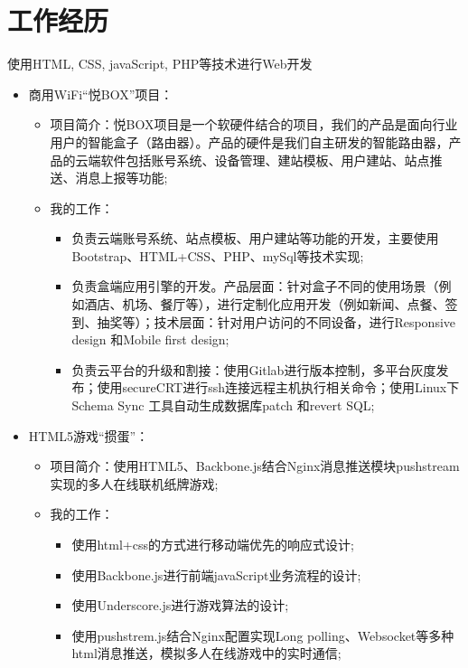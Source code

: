 \documentclass[11pt,a4paper,sans]{moderncv}        %
\begin{document}
\section{工作经历}
{使用HTML, CSS, javaScript, PHP等技术进行Web开发
\newline{}%
\begin{itemize}%
\item 商用WiFi“悦BOX”项目：
  \begin{itemize}%
  \item 项目简介：悦BOX项目是一个软硬件结合的项目，我们的产品是面向行业用户的智能盒子（路由器）。产品的硬件是我们自主研发的智能路由器，产品的云端软件包括账号系统、设备管理、建站模板、用户建站、站点推送、消息上报等功能;
  \item 我的工作：
      \begin{itemize}%
        \item 负责云端账号系统、站点模板、用户建站等功能的开发，主要使用Bootstrap、HTML+CSS、PHP、mySql等技术实现;
        \item 负责盒端应用引擎的开发。产品层面：针对盒子不同的使用场景（例如酒店、机场、餐厅等），进行定制化应用开发（例如新闻、点餐、签到、抽奖等）；技术层面：针对用户访问的不同设备，进行Responsive design 和Mobile first design;
        \item 负责云平台的升级和割接：使用Gitlab进行版本控制，多平台灰度发布；使用secureCRT进行ssh连接远程主机执行相关命令；使用Linux下Schema Sync 工具自动生成数据库patch 和revert SQL;
      \end{itemize}
  \end{itemize}
\item HTML5游戏“掼蛋”：
  \begin{itemize}%
  \item 项目简介：使用HTML5、Backbone.js结合Nginx消息推送模块pushstream实现的多人在线联机纸牌游戏;
  \item 我的工作：
      \begin{itemize}%
        \item 使用html+css的方式进行移动端优先的响应式设计;
        \item 使用Backbone.js进行前端javaScript业务流程的设计;
        \item 使用Underscore.js进行游戏算法的设计;
        \item 使用pushstrem.js结合Nginx配置实现Long polling、Websocket等多种html消息推送，模拟多人在线游戏中的实时通信;

\end{itemize}
\end{itemize}
\end{itemize}}
\end{document}
